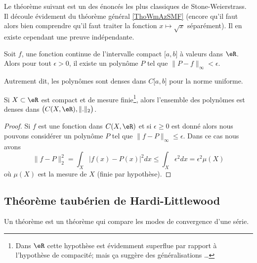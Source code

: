 Le théorème suivant est un des énoncés les plus classiques de Stone-Weierstrass. Il découle évidement du théorème général \ref{ThoWmAzSMF} (encore qu'il faut alors bien comprendre qu'il faut traiter la fonction \( x\mapsto \sqrt{x}\) séparément). Il en existe cependant une preuve indépendante.
\begin{theorem}     \label{ThoGddfas}   
    Soit \( f\), une fonction continue de l'intervalle compact \( \mathopen[ a , b \mathclose]\) à valeurs dans \( \eR\). Alors pour tout \( \epsilon>0\), il existe un polynôme \( P\) tel que \( \| P-f \|_{\infty}<\epsilon\).

    Autrement dit, les polynômes sont denses dans \( C\mathopen[ a , b \mathclose]\) pour la norme uniforme.
\end{theorem}

\begin{corollary}   \label{CorRSczQD}
    Si \( X\subset \eR\) est compact et de mesure finie\footnote{Dans \( \eR\) cette hypothèse est évidemment superflue par rapport à l'hypothèse de compacité; mais ça suggère des généralisations \ldots}, alors l'ensemble des polynômes est denses dans \( \big( C(X,\eR),\| . \|_2 \big)\).
\end{corollary}

\begin{proof}
    Si \( f\) est une fonction dans \( C(X,\eR)\) et si \( \epsilon\geq 0\) est donné alors nous pouvons considérer un polynôme \( P\) tel que \( \| f-P \|_{\infty}\leq \epsilon\). Dans ce cas nous avons
    \begin{equation}
        \| f-P \|_2^2=\int_X| f(x)-P(x) |^2dx\leq \int_X\epsilon^2dx=\epsilon^2\mu(X)
    \end{equation}
    où \( \mu(X)\) est la mesure de \( X\) (finie par hypothèse).
\end{proof}

\subsection{Théorème taubérien de Hardi-Littlewood}

Un théorème  est un théorème qui compare les modes de convergence d'une série.

